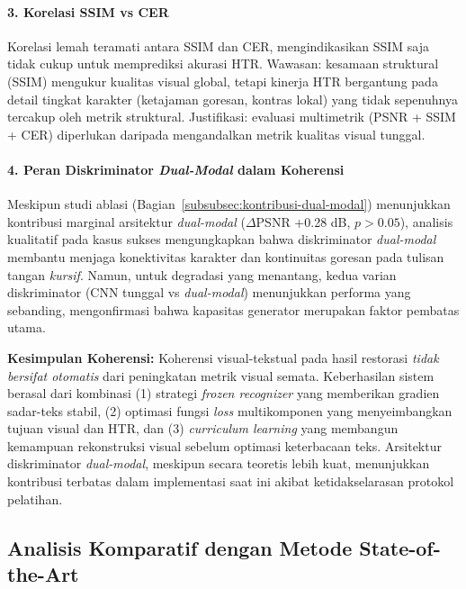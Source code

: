 \documentclass[12pt,a4paper]{article}
\begin{document}
\paragraph{3. Korelasi SSIM vs CER}
Korelasi lemah teramati antara SSIM dan CER, mengindikasikan SSIM saja tidak cukup untuk memprediksi akurasi HTR. Wawasan: kesamaan struktural (SSIM) mengukur kualitas visual global, tetapi kinerja HTR bergantung pada detail tingkat karakter (ketajaman goresan, kontras lokal) yang tidak sepenuhnya tercakup oleh metrik struktural. Justifikasi: evaluasi multimetrik (PSNR + SSIM + CER) diperlukan daripada mengandalkan metrik kualitas visual tunggal.

\paragraph{4. Peran Diskriminator \textit{Dual-Modal} dalam Koherensi}
Meskipun studi ablasi (Bagian~\ref{subsubsec:kontribusi-dual-modal}) menunjukkan kontribusi marginal arsitektur \textit{dual-modal} ($\Delta$PSNR +0.28 dB, $p>0.05$), analisis kualitatif pada kasus sukses mengungkapkan bahwa diskriminator \textit{dual-modal} membantu menjaga konektivitas karakter dan kontinuitas goresan pada tulisan tangan \textit{kursif}. Namun, untuk degradasi yang menantang, kedua varian diskriminator (CNN tunggal vs \textit{dual-modal}) menunjukkan performa yang sebanding, mengonfirmasi bahwa kapasitas generator merupakan faktor pembatas utama.

\textbf{Kesimpulan Koherensi:} Koherensi visual-tekstual pada hasil restorasi \textit{tidak bersifat otomatis} dari peningkatan metrik visual semata. Keberhasilan sistem berasal dari kombinasi (1) strategi \textit{frozen recognizer} yang memberikan gradien sadar-teks stabil, (2) optimasi fungsi \textit{loss} multikomponen yang menyeimbangkan tujuan visual dan HTR, dan (3) \textit{curriculum learning} yang membangun kemampuan rekonstruksi visual sebelum optimasi keterbacaan teks. Arsitektur diskriminator \textit{dual-modal}, meskipun secara teoretis lebih kuat, menunjukkan kontribusi terbatas dalam implementasi saat ini akibat ketidakselarasan protokol pelatihan.

\vspace{0.8em}

\subsection{Analisis Komparatif dengan Metode State-of-the-Art}
\label{subsec:analisis-komparatif}
\vspace{0.8em}
\end{document}
